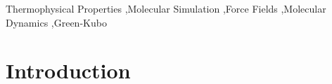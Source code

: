 \documentclass[preprint,review,12pt]{elsarticle}
\begin{document}
\begin{frontmatter}
\begin{abstract}
			
			
			
		\end{abstract}
		
		\begin{keyword}
			
			
			
			Thermophysical Properties \sep Molecular Simulation \sep Force Fields \sep Molecular Dynamics \sep Green-Kubo
			
		\end{keyword}
		
	\end{frontmatter}	
	
%	
%	
%	
%	
%	
	
	\section{Introduction}
	
\end{document}

